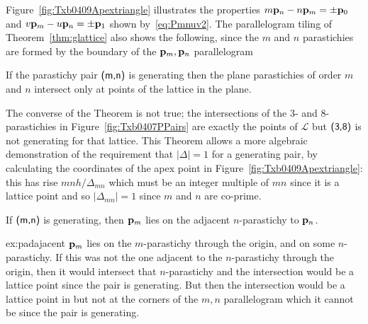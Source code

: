  Figure~\ref{fig:Txb0409Apextriangle} illustrates the properties $m{\mathbf p}_{n}-n{\mathbf p}_{m}=\pm{\mathbf p}_{0}$ and $v{\mathbf p}_{m}-u{\mathbf p}_{n}=\pm{\mathbf p}_{1}$ shown by~\eqref{eq:Pmnuv2}.
%
%
%
The parallelogram tiling of Theorem~\ref{thm:glattice} also shows the following, since the $m$ and $n$ parastichies are formed by the boundary of the ${\mathbf p}_{m},{\mathbf p}_{n}$ parallelogram
\begin{theorem}
	\label{thm:planeintersect}
	If the parastichy pair $\textsf{(m,n)}$ is generating then the plane parastichies of order $m$ and $n$ intersect only at points of the lattice in the plane.
\end{theorem}
The converse of the Theorem is not true; the intersections of the 3- and 8-parastichies in  Figure~\ref{fig:Txb0407PPairs} are exactly the points of $\mathcal{L}$ but $\textsf{(3,8)}$ is not generating for that lattice. 
This Theorem allows a more algebraic demonstration of the requirement that $|\Delta|=1$ for a generating pair,  by calculating the coordinates of the apex point in Figure~\ref{fig:Txb0409Apextriangle}: this has rise $mnh/\Delta_{mn}$ which must be an integer multiple of $mn$ since it is a lattice point and so $|\Delta_{mn}|=1$ since $m$ and $n$ are co-prime.  

	
\begin{jExercise}\label{ex:padajacent}
	If $\textsf{(m,n)}$ is generating, then ${\mathbf p}_{m}$ lies on the adjacent $n$-parastichy to ${\mathbf p}_{n}$. 
\end{jExercise}
\begin{jAnswer}{ex:padajacent}
	${\mathbf p}_{m}$ lies on the $m$-parastichy through the origin, and on some $n$-parastichy. If this was not the one adjacent to the $n$-parastichy through the origin, then it would intersect that $n$-parastichy and the intersection would be a lattice point since the pair is generating. But then the intersection would be a lattice point in but not at the corners of the $m,n$ parallelogram which it cannot be since the pair is generating. 
\end{jAnswer}

